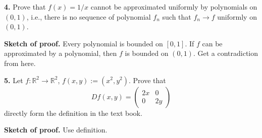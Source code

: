 \documentclass{article}
\begin{document}
    \textbf{4.} Prove that $f(x) = 1/x$ cannot be approximated uniformly by
polynomials on $(0,1)$, i.e., there is no sequence of polynomial $f_n$
such that $f_n \to f$ uniformly on $(0,1)$.

\textbf{Sketch of proof.} Every polynomial is bounded on $[0,1]$. If $f$
can be approximated by a polynomial, then $f$ is bounded on $(0,1)$. Get
a contradiction from here.

    \textbf{5.} Let $f:\mathbb{R}^2 \to \mathbb{R}^2$,
$f(x,y) := (x^2,y^2)$. Prove that
\[Df(x,y) = \begin{pmatrix}2x & 0\\0 & 2y\end{pmatrix}\] directly form
the definition in the text book.

\textbf{Sketch of proof.} Use definition.


    
    
    
    
\end{document}
